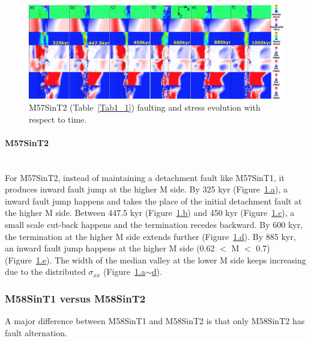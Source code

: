 \begin{figure}[h]
 \centering
  \includegraphics[width=1.0\textwidth]{./Figures/fig_Results_Weakening_4_M57SinT2_time_evolution.eps}
 \caption{M57SinT2 (Table~\hyperref[Tab1_1]{\ref{Tab1_1}}) faulting and stress evolution with respect to time.}
\label{fig_Results_Weakenging_4}
\end{figure}

\paragraph{M57SinT2}\label{para_M57SinT2}
~\\
For M57SinT2, instead of maintaining a detachment fault like M57SinT1, it produces inward fault jump at the higher M side. By 325 kyr (Figure~\hyperref[fig_Results_Weakenging_4]{\ref{fig_Results_Weakenging_4}.a}), a inward fault jump happens and takes the place of the initial detachment fault at the higher M side. Between 447.5 kyr (Figure~\hyperref[fig_Results_Weakenging_4]{\ref{fig_Results_Weakenging_4}.b}) and 450 kyr (Figure~\hyperref[fig_Results_Weakenging_4]{\ref{fig_Results_Weakenging_4}.c}), a small scale cut-back happens and the termination recedes backward. By 600 kyr, the termination at the higher M side extends further (Figure~\hyperref[fig_Results_Weakenging_4]{\ref{fig_Results_Weakenging_4}.d}). By 885 kyr, an inward fault jump happens at the higher M side (0.62 $<$ M $<$ 0.7) (Figure~\hyperref[fig_Results_Weakenging_4]{\ref{fig_Results_Weakenging_4}.e}). The width of the median valley at the lower M side keeps increasing due to the distributed $\sigma_{xx}$ (Figure~\hyperref[fig_Results_Weakenging_4]{\ref{fig_Results_Weakenging_4}.a$\sim$d}).

\subsubsection{M58SinT1 versus M58SinT2}

A major difference between M58SinT1 and M58SinT2 is that only M58SinT2 has fault alternation.

